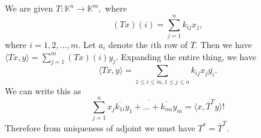 \documentclass{article}
\title{} %
\author{Gandhar Kulkarni (mmat2304)} %
\date{} %
\begin{document}
\maketitle %


\section{} %
\section{} %
\section{} %
\section{} %
\section{} %
\section{} %
\section{} %
\section{} %
\section{} %
We are given $T: \mathbb{K}^n \to \mathbb{K}^m,$ where $$(Tx)(i)=\sum_{j=1}^{n}k_{ij}x_j,$$
where $i=1,2,\dots,m.$ Let $a_i$ denote the $i$th row of $T.$ Then we have $\langle Tx,y \rangle= \sum_{j=1}^m (Tx)(i)y_j.$
Expanding the entire thing, we have $$ \langle Tx,y\rangle= \sum_{1 \leq i \leq m, 1 \leq j \leq n} k_{ij}x_j \bar{y_i}.$$ We can write this as 
$$\sum_{j=1}^n x_j \overline{\overline{k_{1i}}y_1 + \dots + \overline{k_{mi}}y_m} = \langle x, \overline{T}^{T}y \rangle!$$ Therefore from uniqueness of 
adjoint we must have $T^{*}= \overline{T}^{T}.$
\section{} %
\end{document}
